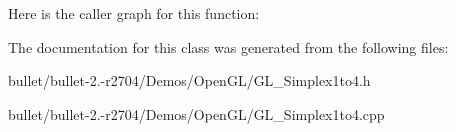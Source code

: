 Here is the caller graph for this function\+:




The documentation for this class was generated from the following files\+:\begin{DoxyCompactItemize}
\item 
bullet/bullet-\/2.-\/r2704/\+Demos/\+Open\+G\+L/G\+L\+\_\+\+Simplex1to4.\+h\item 
bullet/bullet-\/2.-\/r2704/\+Demos/\+Open\+G\+L/G\+L\+\_\+\+Simplex1to4.\+cpp\end{DoxyCompactItemize}
